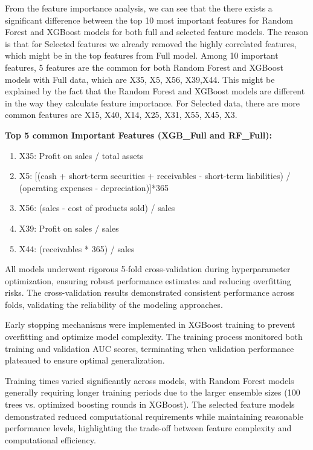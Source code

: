 From the feature importance analysis, we can see that the there exists a significant difference between the top 10 most important features for Random Forest and XGBoost models for both full and selected feature models. The reason is that for Selected features we already removed the highly correlated features, which might be in the top features from Full model.
Among 10 important features, 5 features are the common for both Random Forest and XGBoost models with Full data, which are X35, X5, X56, X39,X44. This might be explained by the fact that the Random Forest and XGBoost models are different in the way they calculate feature importance.
For Selected data, there are more common features are X15, X40, X14, X25, X31, X55, X45, X3.

\textbf{Top 5 common Important Features (XGB\_Full and RF\_Full):}
\begin{enumerate}
    \item X35: Profit on sales / total assets
    \item X5: [(cash + short-term securities + receivables - short-term liabilities) / (operating expenses - depreciation)]*365
    \item X56: (sales - cost of products sold) / sales
    \item X39: Profit on sales / sales
    \item X44: (receivables * 365) / sales
\end{enumerate}

All models underwent rigorous 5-fold cross-validation during hyperparameter optimization, ensuring robust performance estimates and reducing overfitting risks. The cross-validation results demonstrated consistent performance across folds, validating the reliability of the modeling approaches.

Early stopping mechanisms were implemented in XGBoost training to prevent overfitting and optimize model complexity. The training process monitored both training and validation AUC scores, terminating when validation performance plateaued to ensure optimal generalization.

Training times varied significantly across models, with Random Forest models generally requiring longer training periods due to the larger ensemble sizes (100 trees vs. optimized boosting rounds in XGBoost). The selected feature models demonstrated reduced computational requirements while maintaining reasonable performance levels, highlighting the trade-off between feature complexity and computational efficiency. 